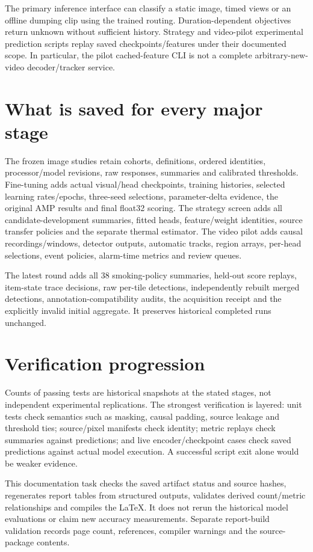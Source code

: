 The primary inference interface can classify a static image, timed views or an offline dumping clip using the trained routing. Duration-dependent objectives return unknown without sufficient history. Strategy and video-pilot experimental prediction scripts replay saved checkpoints/features under their documented scope. In particular, the pilot cached-feature CLI is not a complete arbitrary-new-video decoder/tracker service.

\section{What is saved for every major stage}
The frozen image studies retain cohorts, definitions, ordered identities, processor/model revisions, raw responses, summaries and calibrated thresholds. Fine-tuning adds actual visual/head checkpoints, training histories, selected learning rates/epochs, three-seed selections, parameter-delta evidence, the original AMP results and final float32 scoring. The strategy screen adds all candidate-development summaries, fitted heads, feature/weight identities, source transfer policies and the separate thermal estimator. The video pilot adds causal recordings/windows, detector outputs, automatic tracks, region arrays, per-head selections, event policies, alarm-time metrics and review queues.

The latest round adds all 38 smoking-policy summaries, held-out score replays, item-state trace decisions, raw per-tile detections, independently rebuilt merged detections, annotation-compatibility audits, the acquisition receipt and the explicitly invalid initial aggregate. It preserves historical completed runs unchanged.

\section{Verification progression}

Counts of passing tests are historical snapshots at the stated stages, not independent experimental replications. The strongest verification is layered: unit tests check semantics such as masking, causal padding, source leakage and threshold ties; source/pixel manifests check identity; metric replays check summaries against predictions; and live encoder/checkpoint cases check saved predictions against actual model execution. A successful script exit alone would be weaker evidence.

This documentation task checks the saved artifact status and source hashes, regenerates report tables from structured outputs, validates derived count/metric relationships and compiles the LaTeX. It does not rerun the historical model evaluations or claim new accuracy measurements. Separate report-build validation records page count, references, compiler warnings and the source-package contents.

